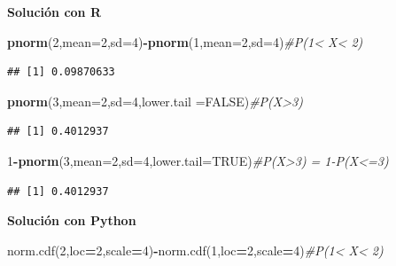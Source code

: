 \documentclass[]{book}
\newenvironment{Shaded}{\begin{snugshade}}{\end{snugshade}}
\newcommand{\CommentTok}[1]{\textcolor[rgb]{0.56,0.35,0.01}{\textit{#1}}}
\newcommand{\DataTypeTok}[1]{\textcolor[rgb]{0.13,0.29,0.53}{#1}}
\newcommand{\DecValTok}[1]{\textcolor[rgb]{0.00,0.00,0.81}{#1}}
\newcommand{\KeywordTok}[1]{\textcolor[rgb]{0.13,0.29,0.53}{\textbf{#1}}}
\newcommand{\NormalTok}[1]{#1}
\newcommand{\OperatorTok}[1]{\textcolor[rgb]{0.81,0.36,0.00}{\textbf{#1}}}
\newcommand{\OtherTok}[1]{\textcolor[rgb]{0.56,0.35,0.01}{#1}}
\begin{document}
\textbf{Solución con R}

\begin{Shaded}
\begin{Highlighting}[]
\KeywordTok{pnorm}\NormalTok{(}\DecValTok{2}\NormalTok{,}\DataTypeTok{mean=}\DecValTok{2}\NormalTok{,}\DataTypeTok{sd=}\DecValTok{4}\NormalTok{)}\OperatorTok{-}\KeywordTok{pnorm}\NormalTok{(}\DecValTok{1}\NormalTok{,}\DataTypeTok{mean=}\DecValTok{2}\NormalTok{,}\DataTypeTok{sd=}\DecValTok{4}\NormalTok{)}\CommentTok{#P(1< X< 2)}
\end{Highlighting}
\end{Shaded}

\begin{verbatim}
## [1] 0.09870633
\end{verbatim}

\begin{Shaded}
\begin{Highlighting}[]
\KeywordTok{pnorm}\NormalTok{(}\DecValTok{3}\NormalTok{,}\DataTypeTok{mean=}\DecValTok{2}\NormalTok{,}\DataTypeTok{sd=}\DecValTok{4}\NormalTok{,}\DataTypeTok{lower.tail =}\OtherTok{FALSE}\NormalTok{)}\CommentTok{#P(X>3)}
\end{Highlighting}
\end{Shaded}

\begin{verbatim}
## [1] 0.4012937
\end{verbatim}

\begin{Shaded}
\begin{Highlighting}[]
\DecValTok{1}\OperatorTok{-}\KeywordTok{pnorm}\NormalTok{(}\DecValTok{3}\NormalTok{,}\DataTypeTok{mean=}\DecValTok{2}\NormalTok{,}\DataTypeTok{sd=}\DecValTok{4}\NormalTok{,}\DataTypeTok{lower.tail=}\OtherTok{TRUE}\NormalTok{)}\CommentTok{#P(X>3) = 1-P(X<=3)}
\end{Highlighting}
\end{Shaded}

\begin{verbatim}
## [1] 0.4012937
\end{verbatim}

\textbf{Solución con Python}

\begin{Shaded}
\begin{Highlighting}[]
\NormalTok{norm.cdf(}\DecValTok{2}\NormalTok{,loc}\OperatorTok{=}\DecValTok{2}\NormalTok{,scale}\OperatorTok{=}\DecValTok{4}\NormalTok{)}\OperatorTok{-}\NormalTok{norm.cdf(}\DecValTok{1}\NormalTok{,loc}\OperatorTok{=}\DecValTok{2}\NormalTok{,scale}\OperatorTok{=}\DecValTok{4}\NormalTok{)}\CommentTok{#P(1< X< 2)}
\end{Highlighting}
\end{Shaded}
\end{document}
